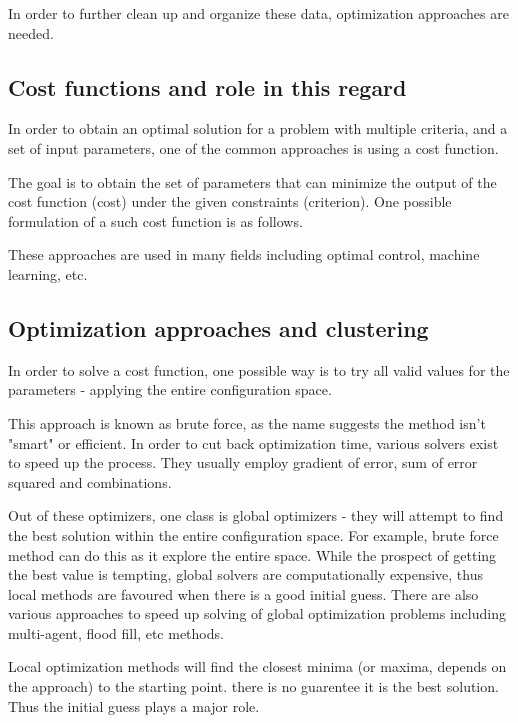 \documentclass[english, printversion, nomenclature, notitle]{tuvisionthesis} %
\begin{document}
In order to further clean up and organize these data, optimization approaches are needed.

\subsection{Cost functions and role in this regard}

In order to obtain an optimal solution for a problem with multiple criteria, and a set of input parameters, one of the common approaches is using a cost function.

The goal is to obtain the set of parameters that can minimize the output of the cost function (cost) under the given constraints (criterion). One possible formulation of a such cost function is as follows.


These approaches are used in many fields including optimal control, machine learning, etc.

\subsection{Optimization approaches and clustering}

In order to solve a cost function, one possible way is to try all valid values for the parameters - applying the entire configuration space.

This approach is known as brute force, as the name suggests the method isn't "smart" or efficient. In order to cut back optimization time, various solvers exist to speed up the process. They usually employ gradient of error, sum of error squared and combinations.

Out of these optimizers, one class is global optimizers - they will attempt to find the best solution within the entire configuration space. For example, brute force method can do this as it explore the entire space. While the prospect of getting the best value is tempting, global solvers are computationally expensive, thus local methods are favoured when there is a good initial guess. There are also various approaches to speed up solving of global optimization problems including multi-agent, flood fill, etc methods. 

Local optimization methods will find the closest minima (or maxima, depends on the approach) to the starting point. there is no guarentee it is the best solution. Thus the initial guess plays a major role.
\end{document}
